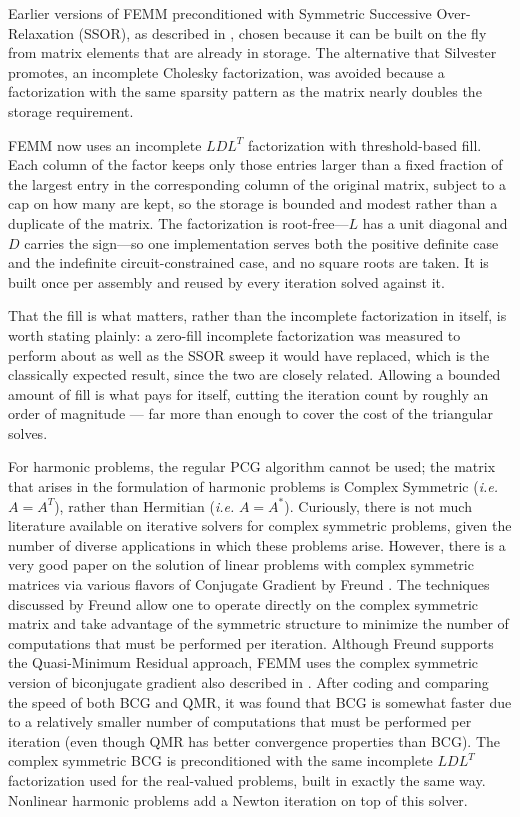 \documentclass[12pt]{report}
\begin{document}
Earlier versions of FEMM preconditioned with Symmetric Successive
Over-Relaxation (SSOR), as described in \cite{fletcher}, chosen because
it can be built on the fly from matrix elements that are already in
storage.  The alternative that Silvester promotes, an incomplete
Cholesky factorization, was avoided because a factorization with the
same sparsity pattern as the matrix nearly doubles the storage
requirement.

FEMM now uses an incomplete $LDL^T$ factorization with threshold-based
fill.  Each column of the factor keeps only those entries larger than a
fixed fraction of the largest entry in the corresponding column of the
original matrix, subject to a cap on how many are kept, so the storage
is bounded and modest rather than a duplicate of the matrix.  The
factorization is root-free---$L$ has a unit diagonal and $D$ carries the
sign---so one implementation serves both the positive definite case and
the indefinite circuit-constrained case, and no square roots are taken.
It is built once per assembly and reused by every iteration solved
against it.

That the fill is what matters, rather than the incomplete factorization
in itself, is worth stating plainly: a zero-fill incomplete
factorization was measured to perform about as well as the SSOR sweep it
would have replaced, which is the classically expected result, since the
two are closely related.  Allowing a bounded amount of fill is what pays
for itself, cutting the iteration count by roughly an order of magnitude
--- far more than enough to cover the cost of the triangular solves.

For harmonic problems, the regular PCG algorithm cannot be used; the
matrix that arises in the formulation of harmonic problems is Complex
Symmetric ({\em i.e.} $A=A^T$), rather than Hermitian ({\em i.e.}
$A=A^*$).  Curiously, there is not much literature available on
iterative solvers for complex symmetric problems, given the number of
diverse applications in which these problems arise.  However, there is a
very good paper on the solution of linear problems with complex
symmetric matrices via various flavors of Conjugate Gradient by Freund
\cite{freund}.  The techniques discussed by Freund allow one to operate
directly on the complex symmetric matrix and take advantage of the
symmetric structure to minimize the number of computations that must be
performed per iteration.  Although Freund supports the Quasi-Minimum
Residual approach, FEMM uses the complex symmetric version of
biconjugate gradient also described in \cite{freund}.  After coding and
comparing the speed of both BCG and QMR, it was found that BCG is
somewhat faster due to a relatively smaller number of computations that
must be performed per iteration (even though QMR has better convergence
properties than BCG).  The complex symmetric BCG is preconditioned with
the same incomplete $LDL^T$ factorization used for the real-valued
problems, built in exactly the same way.  Nonlinear harmonic problems
add a Newton iteration on top of this solver.
\end{document}
